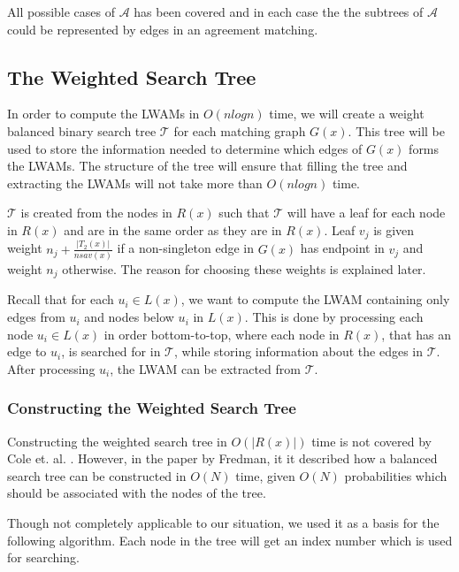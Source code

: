 All possible cases of $\mathcal{A}$ has been covered and in each case the the subtrees of $\mathcal{A}$ could be represented by edges in an agreement matching.

\subsection{The Weighted Search Tree}
In order to compute the LWAMs in $O(nlogn)$ time, we will create a weight balanced binary search tree $\mathcal{T}$ for each matching graph $G(x)$. This tree will be used to store the information needed to determine which edges of $G(x)$ forms the LWAMs. The structure of the tree will ensure that filling the tree and extracting the LWAMs will not take more than $O(nlogn)$ time.

$\mathcal{T}$ is created from the nodes in $R(x)$ such that $\mathcal{T}$ will have a leaf for each node in $R(x)$ and are in the same order as they are in $R(x)$. Leaf $v_j$ is given weight $n_j + \frac{|T_2(x)|}{nsav(x)}$ if a non-singleton edge in $G(x)$ has endpoint in $v_j$ and weight $n_j$ otherwise. The reason for choosing these weights is explained later.

Recall that for each $u_i \in L(x)$, we want to compute the LWAM containing only edges from $u_i$ and nodes below $u_i$ in $L(x)$. This is done by processing each node $u_i \in L(x)$ in order bottom-to-top, where each node in $R(x)$, that has an edge to $u_i$, is searched for in $\mathcal{T}$, while storing information about the edges in $\mathcal{T}$.  After processing $u_i$, the LWAM can be extracted from $\mathcal{T}$. 

\subsubsection{Constructing the Weighted Search Tree}
Constructing the weighted search tree in $O(|R(x)|)$ time is not covered by Cole et. al. \cite{nlogn}. However, in the paper \cite{fredman} by Fredman, it it described how a balanced search tree can be constructed in $O(N)$ time, given $O(N)$ probabilities which should be associated with the nodes of the tree.

Though not completely applicable to our situation, we used it as a basis for the following algorithm. Each node in the tree will get an index number which is used for searching.

